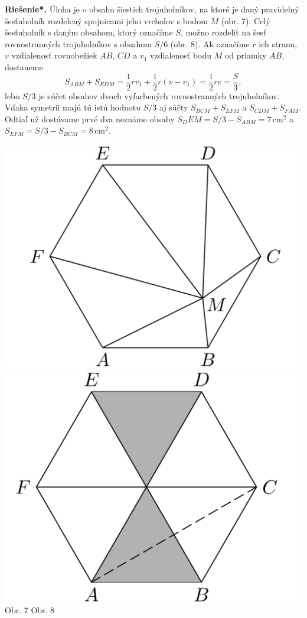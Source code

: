 \documentclass[11pt,a4paper,oneside,final]{book}
\newcommand{\rieh}{\textbf{Riešenie*.} }
\begin{document}
\rieh Úloha je o obsahu šiestich trojuholníkov, na ktoré je daný pravidelný šesťuholník rozdelený spojnicami jeho vrcholov s bodom $M$ (obr. 7). Celý šesťuholník s daným obsahom, ktorý označíme $S$, možno rozdeliť na šesť rovnostranných trojuholníkov s obsahom $S/6$ (obr. 8). Ak označíme $r$ ich stranu, $v$ vzdialenosť rovnobežiek $AB$, $CD$ a $v_1$ vzdialenosť bodu $M$ od priamky $AB$, dostaneme
$$S_{ABM} + S_{EDM} =\frac{1}{2}rv_1 +\frac{1}{2}r(v - v_1 ) = \frac{1}{2} rv =\frac{S}{3},$$
lebo $S/3$ je súčet obsahov dvoch vyfarbených rovnostranných trojuholníkov. Vďaka symetrii majú tú istú hodnotu $S/3$ aj súčty $S_{BCM} +S_{EFM}$ a $S_{CDM} +S_{FAM}$. Odtiaľ už dostávame prvé dva neznáme obsahy $S_DEM = S/3 - S_{ABM} = 7$\,cm$^2$ a $S_{EFM}= S/3 - S_{BCM} = 8$\,cm$^2$.
\begin{center}
\includegraphics{62D61} \includegraphics{62D62}\\

Obr. 7  \hspace{160pt} Obr. 8
\end{center}
\end{document}
